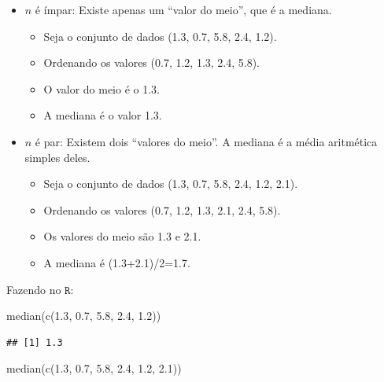 \documentclass[
]{book}
\newenvironment{Shaded}{\begin{snugshade}}{\end{snugshade}}
\newcommand{\FloatTok}[1]{\textcolor[rgb]{0.00,0.00,0.81}{#1}}
\newcommand{\FunctionTok}[1]{\textcolor[rgb]{0.00,0.00,0.00}{#1}}
\newcommand{\NormalTok}[1]{#1}
\providecommand{\tightlist}{%
  \setlength{\itemsep}{0pt}\setlength{\parskip}{0pt}}
\begin{document}
\begin{itemize}
\item
  \(n\) é ímpar: Existe apenas um ``valor do meio'', que é a mediana.

  \begin{itemize}
  \tightlist
  \item
    Seja o conjunto de dados (1.3, 0.7, 5.8, 2.4, 1.2).
  \item
    Ordenando os valores (0.7, 1.2, 1.3, 2.4, 5.8).
  \item
    O valor do meio é o 1.3.
  \item
    A mediana é o valor 1.3.
  \end{itemize}
\item
  \(n\) é par: Existem dois ``valores do meio''. A mediana é a média aritmética simples deles.

  \begin{itemize}
  \tightlist
  \item
    Seja o conjunto de dados (1.3, 0.7, 5.8, 2.4, 1.2, 2.1).
  \item
    Ordenando os valores (0.7, 1.2, 1.3, 2.1, 2.4, 5.8).
  \item
    Os valores do meio são 1.3 e 2.1.
  \item
    A mediana é (1.3+2.1)/2=1.7.
  \end{itemize}
\end{itemize}

Fazendo no \(\texttt{R}\):

\begin{Shaded}
\begin{Highlighting}[]
\FunctionTok{median}\NormalTok{(}\FunctionTok{c}\NormalTok{(}\FloatTok{1.3}\NormalTok{, }\FloatTok{0.7}\NormalTok{, }\FloatTok{5.8}\NormalTok{, }\FloatTok{2.4}\NormalTok{, }\FloatTok{1.2}\NormalTok{))}
\end{Highlighting}
\end{Shaded}

\begin{verbatim}
## [1] 1.3
\end{verbatim}

\begin{Shaded}
\begin{Highlighting}[]
\FunctionTok{median}\NormalTok{(}\FunctionTok{c}\NormalTok{(}\FloatTok{1.3}\NormalTok{, }\FloatTok{0.7}\NormalTok{, }\FloatTok{5.8}\NormalTok{, }\FloatTok{2.4}\NormalTok{, }\FloatTok{1.2}\NormalTok{, }\FloatTok{2.1}\NormalTok{))}
\end{Highlighting}
\end{Shaded}
\end{document}
